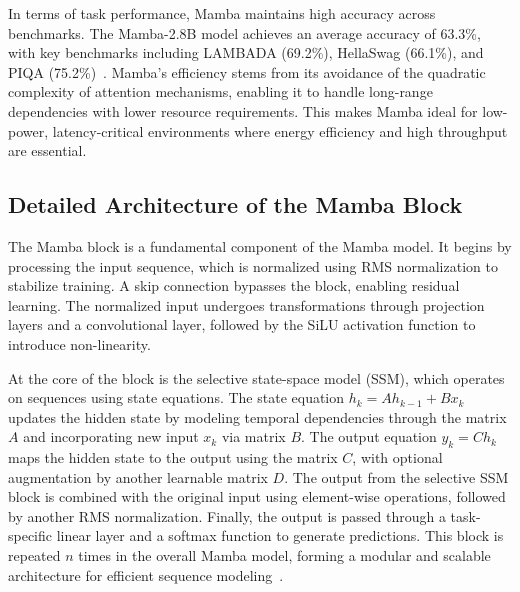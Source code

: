 In terms of task performance, Mamba maintains high accuracy across benchmarks. The Mamba-2.8B model achieves an average accuracy of 63.3\%, with key benchmarks including LAMBADA (69.2\%), HellaSwag (66.1\%), and PIQA (75.2\%)~\cite{mamba_benchmarks}. Mamba's efficiency stems from its avoidance of the quadratic complexity of attention mechanisms, enabling it to handle long-range dependencies with lower resource requirements. This makes Mamba ideal for low-power, latency-critical environments where energy efficiency and high throughput are essential.

\subsection{Detailed Architecture of the Mamba Block}
The Mamba block is a fundamental component of the Mamba model. It begins by processing the input sequence, which is normalized using RMS normalization to stabilize training. A skip connection bypasses the block, enabling residual learning. The normalized input undergoes transformations through projection layers and a convolutional layer, followed by the SiLU activation function to introduce non-linearity. 

At the core of the block is the selective state-space model (SSM), which operates on sequences using state equations. The state equation $h_k = A h_{k-1} + B x_k$ updates the hidden state by modeling temporal dependencies through the matrix $A$ and incorporating new input $x_k$ via matrix $B$. The output equation $y_k = C h_k$ maps the hidden state to the output using the matrix $C$, with optional augmentation by another learnable matrix $D$. The output from the selective SSM block is combined with the original input using element-wise operations, followed by another RMS normalization. Finally, the output is passed through a task-specific linear layer and a softmax function to generate predictions. This block is repeated $n$ times in the overall Mamba model, forming a modular and scalable architecture for efficient sequence modeling~\cite{mamba_architecture}.